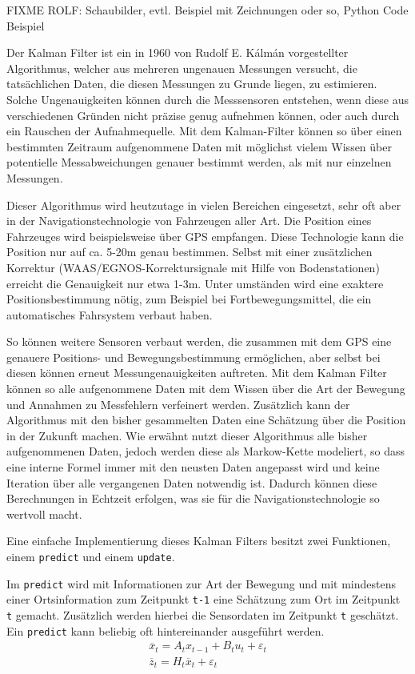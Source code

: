 \documentclass[12pt,a4paper,ngerman]{scrartcl}
\begin{document}
{\color{red} FIXME ROLF: Schaubilder, evtl. Beispiel mit Zeichnungen oder so, Python Code Beispiel}

Der Kalman Filter ist ein in 1960 von Rudolf E. Kálmán vorgestellter Algorithmus, welcher aus mehreren ungenauen Messungen versucht, die tatsächlichen Daten, die diesen Messungen zu Grunde liegen, zu estimieren.\cite{kalman} Solche Ungenauigkeiten können durch die Messsensoren entstehen, wenn diese aus verschiedenen Gründen nicht präzise genug aufnehmen können, oder auch durch ein Rauschen der Aufnahmequelle. Mit dem Kalman-Filter können so über einen bestimmten Zeitraum aufgenommene Daten mit möglichst vielem Wissen über potentielle Messabweichungen genauer bestimmt werden, als mit nur einzelnen Messungen.

Dieser Algorithmus wird heutzutage in vielen Bereichen eingesetzt, sehr oft aber in der Navigationstechnologie von Fahrzeugen aller Art. Die Position eines Fahrzeuges wird beispielsweise über GPS empfangen. Diese Technologie kann die Position nur auf ca. 5-20m genau bestimmen. Selbst mit einer zusätzlichen Korrektur (WAAS/EGNOS-Korrektursignale mit Hilfe von Bodenstationen\cite{waas}\cite{egnos}) erreicht die Genauigkeit nur etwa 1-3m. Unter umständen wird eine exaktere Positionsbestimmung nötig, zum Beispiel bei Fortbewegungsmittel, die ein automatisches Fahrsystem verbaut haben.

So können weitere Sensoren verbaut werden, die zusammen mit dem GPS eine genauere Positions- und Bewegungsbestimmung ermöglichen, aber selbst bei diesen können erneut Messungenauigkeiten auftreten. Mit dem Kalman Filter können so alle aufgenommene Daten mit dem Wissen über die Art der Bewegung und Annahmen zu Messfehlern verfeinert werden. Zusätzlich kann der Algorithmus mit den bisher gesammelten Daten eine Schätzung über die Position in der Zukunft machen. Wie erwähnt nutzt dieser Algorithmus alle bisher aufgenommenen Daten, jedoch werden diese als Markow-Kette modeliert, so dass eine interne Formel immer mit den neusten Daten angepasst wird und keine Iteration über alle vergangenen Daten notwendig ist. Dadurch können diese Berechnungen in Echtzeit erfolgen, was sie für die Navigationstechnologie so wertvoll macht.

Eine einfache Implementierung dieses Kalman Filters besitzt zwei Funktionen, einem {\tt predict} und einem {\tt update}.

Im {\tt predict} wird mit Informationen zur Art der Bewegung und mit mindestens einer Ortsinformation zum Zeitpunkt {\tt t-1} eine Schätzung zum Ort im Zeitpunkt {\tt t} gemacht. Zusätzlich werden hierbei die Sensordaten im Zeitpunkt {\tt t} geschätzt. Ein {\tt predict} kann beliebig oft hintereinander ausgeführt werden.
\begin{align}
\overline{x}_{t} = A_{t}x_{t-1} + B_{t}u_{t} + \varepsilon_{t} \label{eq:predict1}\\
\overline{z}_{t} = H_{t}\overline{x}_{t} + \varepsilon_{t} \label{eq:predict2}
\end{align}
\end{document}
